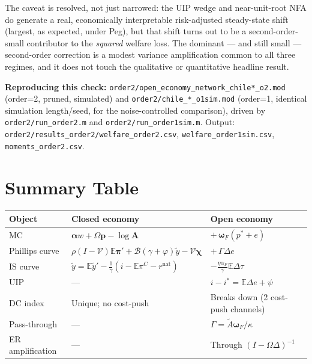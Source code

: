 \documentclass[12pt]{article}
\begin{document}
\begin{insight}
The caveat is resolved, not just narrowed: the UIP wedge and near-unit-root NFA do generate a real, economically interpretable risk-adjusted steady-state shift (largest, as expected, under Peg), but that shift turns out to be a second-order-small contributor to the \emph{squared} welfare loss. The dominant --- and still small --- second-order correction is a modest variance amplification common to all three regimes, and it does not touch the qualitative or quantitative headline result.
\end{insight}

\begin{codebox}
\textbf{Reproducing this check:} \texttt{order2/open\_economy\_network\_chile*\_o2.mod} (order=2, pruned, simulated) and \texttt{order2/chile\_*\_o1sim.mod} (order=1, identical simulation length/seed, for the noise-controlled comparison), driven by \texttt{order2/run\_order2.m} and \texttt{order2/run\_order1sim.m}. Output: \texttt{order2/results\_order2/welfare\_order2.csv}, \texttt{welfare\_order1sim.csv}, \texttt{moments\_order2.csv}.
\end{codebox}

\section{Summary Table}

\begin{center}
\begin{tabular}{lll}
\toprule
\textbf{Object} & \textbf{Closed economy} & \textbf{Open economy} \\
\midrule
MC & $\bm{\alpha}w + \Omega\bm{p} - \log\mathbf{A}$ & $+\,\bm{\omega}_F(p^*+e)$ \\
Phillips curve & $\rho(I-\mathcal{V})\mathbb{E}\bm{\pi}' + \mathcal{B}(\gamma+\varphi)\tilde{y} - \mathcal{V}\bm{\chi}$ & $+\,\Gamma\Delta e$ \\
IS curve & $\tilde{y} = \mathbb{E}\tilde{y}' - \frac{1}{\gamma}(i - \mathbb{E}\pi^C - r^{\mathrm{nat}})$ & $-\frac{\eta\alpha_F}{\gamma}\mathbb{E}\Delta\tau$ \\
UIP & --- & $i - i^* = \mathbb{E}\Delta e + \psi$ \\
DC index & Unique; no cost-push & Breaks down (2 cost-push channels) \\
Pass-through & --- & $\Gamma = \tilde{A}\bm{\omega}_F/\kappa$ \\
ER amplification & --- & Through $(I-\Omega\Delta)^{-1}$ \\
\bottomrule
\end{tabular}
\end{center}
\end{document}
